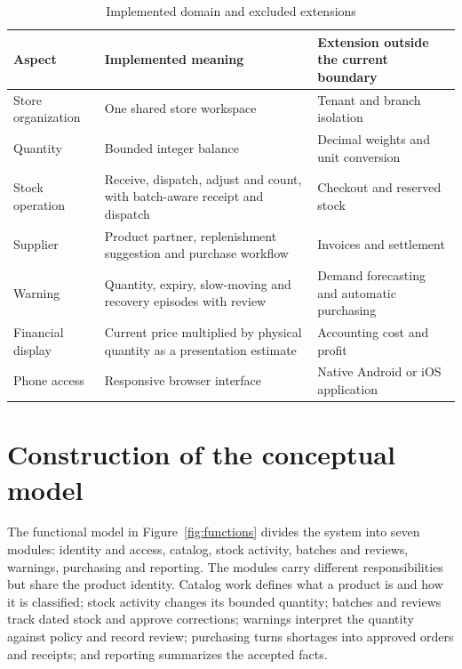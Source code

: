\begin{table}[htbp]\centering\small{}\setlength{\tabcolsep}{3pt}\renewcommand{\arraystretch}{1.25}
\caption{Implemented domain and excluded extensions}\label{tab:scope}
\begin{tabular}{>{\raggedright\arraybackslash}p{}>{\raggedright\arraybackslash}p{}>{\raggedright\arraybackslash}p{}}
\toprule
\textbf{Aspect} & \textbf{Implemented meaning} & \textbf{Extension outside the current boundary} \\
\midrule
\leavevmode{}Store organization & \leavevmode{}One shared store workspace & \leavevmode{}Tenant and branch isolation \\
\leavevmode{}Quantity & \leavevmode{}Bounded integer balance & \leavevmode{}Decimal weights and unit conversion \\
\leavevmode{}Stock operation & \leavevmode{}Receive, dispatch, adjust and count, with batch-aware receipt and dispatch & \leavevmode{}Checkout and reserved stock \\
\leavevmode{}Supplier & \leavevmode{}Product partner, replenishment suggestion and purchase workflow & \leavevmode{}Invoices and settlement \\
\leavevmode{}Warning & \leavevmode{}Quantity, expiry, slow-moving and recovery episodes with review & \leavevmode{}Demand forecasting and automatic purchasing \\
\leavevmode{}Financial display & \leavevmode{}Current price multiplied by physical quantity as a presentation estimate & \leavevmode{}Accounting cost and profit \\
\leavevmode{}Phone access & \leavevmode{}Responsive browser interface & \leavevmode{}Native Android or iOS application \\
\bottomrule\end{tabular}\end{table}

\FloatBarrier

\section{Construction of the conceptual model}

The functional model in Figure~\ref{fig:functions} divides the system into seven modules: identity and access, catalog, stock activity, batches and reviews, warnings, purchasing and reporting. The modules carry different responsibilities but share the product identity. Catalog work defines what a product is and how it is classified; stock activity changes its bounded quantity; batches and reviews track dated stock and approve corrections; warnings interpret the quantity against policy and record review; purchasing turns shortages into approved orders and receipts; and reporting summarizes the accepted facts.



